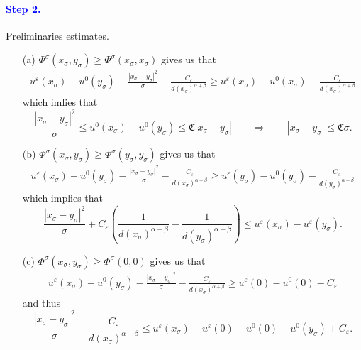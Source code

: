 \documentclass[11pt,reqno]{amsart}
\numberwithin{figure}{section}
\theoremstyle{plain}
\theoremstyle{remark}
\numberwithin{equation}{section}
\begin{document}
\paragraph{\textcolor{blue}{\textbf{Step 2.}}} Preliminaries estimates.
\begin{itemize} 
    \item[(a)] $\Phi^\sigma(x_\sigma,y_\sigma) \geq \Phi^\sigma(x_\sigma,x_\sigma)$ gives us that
    \begin{align*}
        u^\varepsilon(x_\sigma) - u^0(y_\sigma) - \frac{|x_\sigma-y_\sigma|^2}{\sigma}- \frac{C_\varepsilon}{d(x_\sigma)^{\alpha+\beta}} \geq u^\varepsilon(x_\sigma) - u^0(x_\sigma) -  \frac{C_\varepsilon}{d(x_\sigma)^{\alpha+\beta}}
    \end{align*}
    which imlies that
    \begin{equation}\label{e:est_sigma}
        \frac{|x_\sigma-y_\sigma|^2}{\sigma} \leq u^0(x_\sigma) - u^0(y_\sigma) \leq \mathfrak{C}|x_\sigma-y_\sigma| \qquad\Longrightarrow\qquad |x_\sigma -y _\sigma|\leq \mathfrak{C}\sigma.
    \end{equation}
    \item[(b)] $\Phi^\sigma(x_\sigma,y_\sigma) \geq \Phi^\sigma(y_\sigma,y_\sigma)$ gives us that
    \begin{align*}
        u^\varepsilon(x_\sigma) - u^0(y_\sigma) - \frac{|x_\sigma-y_\sigma|^2}{\sigma}- \frac{C_\varepsilon}{d(x_\sigma)^{\alpha+\beta}} \geq u^\varepsilon(y_\sigma) - u^0(y_\sigma) -  \frac{C_\varepsilon}{d(y_\sigma)^{\alpha+\beta}}
    \end{align*}
    which implies that
    \begin{equation*}
        \frac{|x_\sigma-y_\sigma|^2}{\sigma} + C_\varepsilon\left(\frac{1}{d(x_\sigma)^{\alpha+\beta}} - \frac{1}{d(y_\sigma)^{\alpha+\beta}}\right) \leq u^\varepsilon(x_\sigma) - u^\varepsilon(y_\sigma) .
    \end{equation*}
    \item[(c)] $\Phi^\sigma(x_\sigma,y_\sigma) \geq \Phi^\sigma(0,0)$ gives us that
    \begin{align*}
        u^\varepsilon(x_\sigma) - u^0(y_\sigma) - \frac{|x_\sigma-y_\sigma|^2}{\sigma}- \frac{C_\varepsilon}{d(x_\sigma)^{\alpha+\beta}} \geq u^\varepsilon(0) - u^0(0) -  C_\varepsilon
    \end{align*}
    and thus 
    \begin{equation*}
         \frac{|x_\sigma-y_\sigma|^2}{\sigma}+ \frac{C_\varepsilon}{d(x_\sigma)^{\alpha+\beta}}  \leq u^\varepsilon(x_\sigma) - u^\varepsilon(0) + u^0(0) - u^0(y_\sigma) + C_\varepsilon.
    \end{equation*}
\end{itemize}
\end{document}
